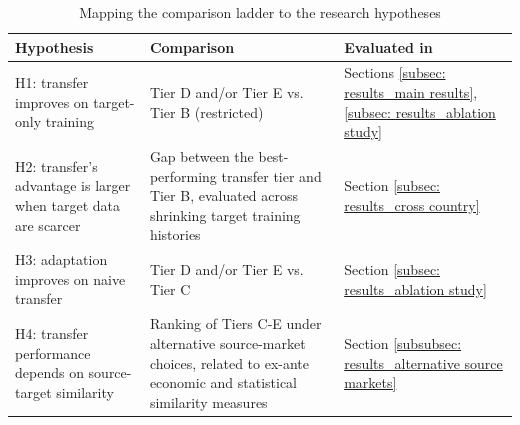 \vspace{-10pt}
\begin{table}[h!]
\caption{Mapping the comparison ladder to the research hypotheses} 
\label{tab:mapping to the research hypotheses}
\footnotesize

\begin{tabularx}{\textwidth}{
    @{}
    >{\raggedright\arraybackslash}p{}
    >{\raggedright\arraybackslash}X
    >{\raggedright\arraybackslash}p{}
    @{}
}
\toprule
\textbf{Hypothesis} &
\textbf{Comparison} &
\textbf{Evaluated in}  \\
\midrule
H1: transfer improves on target-only training &
Tier D and/or Tier E vs. Tier B (restricted) &
Sections \ref{subsec: results_main results}, \ref{subsec: results_ablation study} \\
\midrule
H2: transfer's advantage is larger when target data are scarcer &
Gap between the best-performing transfer tier and Tier B, evaluated across shrinking target training histories&
Section \ref{subsec: results_cross country} \\
\midrule
H3: adaptation improves on naive transfer &
Tier D and/or Tier E vs. Tier C &
Section \ref{subsec: results_ablation study} \\
\midrule
H4: transfer performance depends on source-target similarity &
Ranking of Tiers C-E under alternative source-market choices, related to ex-ante economic and statistical similarity measures &
Section \ref{subsubsec: results_alternative source markets} \\

\bottomrule
\end{tabularx}
\end{table}

